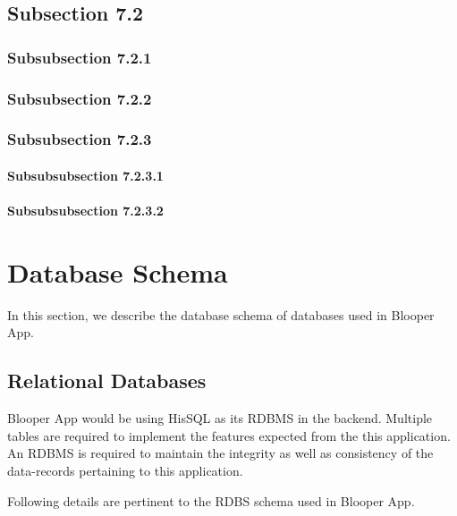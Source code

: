 \documentclass{article}%
\begin{document}
\subsection{Subsection 7.2}%

%
\hypertarget{ID:1376132053}{}%
\subsubsection{Subsubsection 7.2.1}%

%
\hypertarget{ID:684849006}{}%
\subsubsection{Subsubsection 7.2.2}%

%
\hypertarget{ID:1332164782}{}%
\subsubsection{Subsubsection 7.2.3}%

%
\hypertarget{ID:892716213}{}%
\paragraph{Subsubsubsection 7.2.3.1}%

%
\hypertarget{ID:1108084290}{}%
\paragraph{Subsubsubsection 7.2.3.2}%

%
\hypertarget{ID:1060163767}{}%
\section{Database Schema}%

%
In this section, we describe the database schema of databases used in Blooper App.%
\hypertarget{ID:1430871552}{}%
\subsection{Relational Databases}%

%
Blooper App would be using HisSQL as its RDBMS in the backend. Multiple tables are required to implement the features expected from the this application. An RDBMS is required to maintain the integrity as well as consistency of the data{-}records pertaining to this application.%
\par%
Following details are pertinent to the RDBS schema used in Blooper App.%
\hypertarget{ID:979518749}{}%
\end{document}
